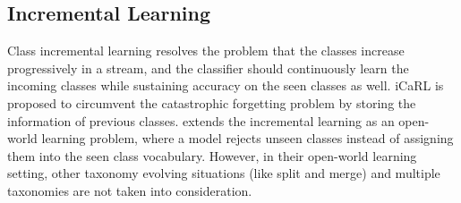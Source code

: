 \subsection{Incremental Learning}
Class incremental learning resolves the problem that the classes increase progressively in a stream, and the classifier should continuously learn the incoming classes while sustaining accuracy on the seen classes as well. iCaRL \cite{rebuffi2017icarl} is proposed to 
circumvent the catastrophic forgetting problem by storing the information of previous classes. 
\cite{xu2019open} extends the incremental learning as an open-world learning problem, where a model rejects unseen classes instead of assigning them into the seen class vocabulary. 
However, in their open-world learning setting, other taxonomy evolving situations (like split and merge) and multiple taxonomies are not taken into consideration.